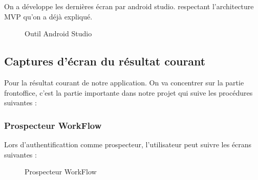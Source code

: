 On a d\'eveloppe les derni\`eres \'ecran par android studio. respectant l'architecture \gls{MVP} qu'on a d\'ej\`a expliqu\'e.

\begin{figure}[H]
	\caption{\label{fig:my-label} Outil Android Studio}
\end{figure}

\subsection{Captures d'\'ecran du r\'esultat courant}

Pour la r\'esultat courant de notre application. On va concentrer sur la partie frontoffice, c'est la partie importante dans notre projet qui suive les proc\'edures suivantes : 

\subsubsection{Prospecteur WorkFlow}

Lors d'authentificattion comme prospecteur, l'utilisateur peut suivre les \'ecrans suivantes :

\begin{figure}[H]
	\caption{\label{fig:my-label} Prospecteur WorkFlow}
\end{figure}

